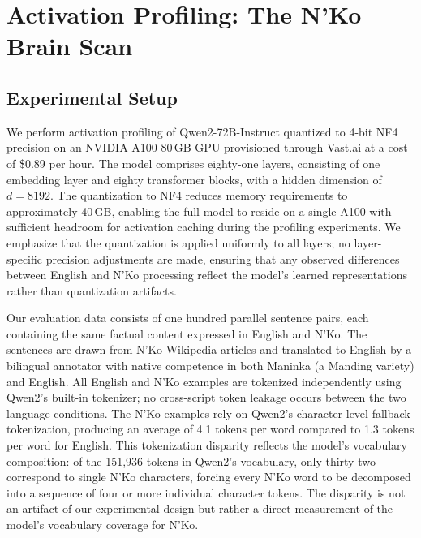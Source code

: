 \documentclass[11pt]{article}
\newcommand{\nko}{N'Ko}
\begin{document}
\section{Activation Profiling: The \nko{} Brain Scan}
\label{sec:brain_scan}

\subsection{Experimental Setup}
\label{sec:brain_setup}

We perform activation profiling of Qwen2-72B-Instruct quantized to 4-bit NF4 precision on an NVIDIA A100 80\,GB GPU provisioned through Vast.ai at a cost of \$0.89 per hour. The model comprises eighty-one layers, consisting of one embedding layer and eighty transformer blocks, with a hidden dimension of $d = 8192$. The quantization to NF4 reduces memory requirements to approximately 40\,GB, enabling the full model to reside on a single A100 with sufficient headroom for activation caching during the profiling experiments. We emphasize that the quantization is applied uniformly to all layers; no layer-specific precision adjustments are made, ensuring that any observed differences between English and \nko{} processing reflect the model's learned representations rather than quantization artifacts.

Our evaluation data consists of one hundred parallel sentence pairs, each containing the same factual content expressed in English and \nko{}. The sentences are drawn from \nko{} Wikipedia articles and translated to English by a bilingual annotator with native competence in both Maninka (a Manding variety) and English. All English and \nko{} examples are tokenized independently using Qwen2's built-in tokenizer; no cross-script token leakage occurs between the two language conditions. The \nko{} examples rely on Qwen2's character-level fallback tokenization, producing an average of 4.1 tokens per word compared to 1.3 tokens per word for English. This tokenization disparity reflects the model's vocabulary composition: of the 151,936 tokens in Qwen2's vocabulary, only thirty-two correspond to single \nko{} characters, forcing every \nko{} word to be decomposed into a sequence of four or more individual character tokens. The disparity is not an artifact of our experimental design but rather a direct measurement of the model's vocabulary coverage for \nko{}.
\end{document}
